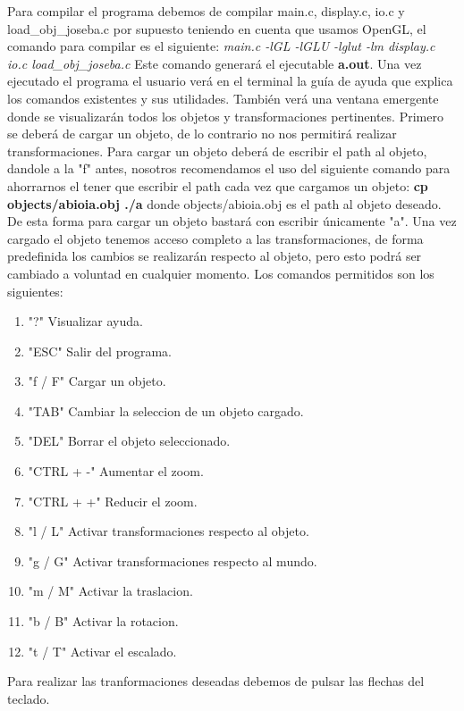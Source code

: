 \documentclass[12pt,a4paper]{article}
\begin{document}
Para compilar el programa debemos de compilar main.c, display.c, io.c y load\_obj\_joseba.c por supuesto teniendo en cuenta que usamos OpenGL, el comando para compilar es el siguiente:\newline
\textit{main.c -lGL -lGLU -lglut -lm display.c io.c load\_obj\_joseba.c}\newline
Este comando generará el ejecutable \textbf{a.out}. \newline
Una vez ejecutado el programa el usuario verá en el terminal la guía de ayuda que explica los comandos existentes y sus utilidades. También verá una ventana emergente donde se visualizarán todos los objetos y transformaciones pertinentes. \newline
Primero se deberá de cargar un objeto, de lo contrario no nos permitirá realizar transformaciones. Para cargar un objeto deberá de escribir el path al objeto, dandole a la "f" antes, nosotros recomendamos el uso del siguiente comando para ahorrarnos el tener que escribir el path cada vez que cargamos un objeto: \textbf{cp objects/abioia.obj ./a} donde objects/abioia.obj es el path al objeto deseado. De esta forma para cargar un objeto bastará con escribir únicamente "a".\newline
Una vez cargado el objeto tenemos acceso completo a las transformaciones, de forma predefinida los cambios se realizarán respecto al objeto, pero esto podrá ser cambiado a voluntad en cualquier momento. Los comandos permitidos son los siguientes:
\begin{enumerate}
\item "?"		 		 Visualizar ayuda.
\item "ESC"		 		 Salir del programa.
\item "f / F"				 Cargar un objeto.
\item "TAB"		 		 Cambiar la seleccion de un objeto cargado.
\item "DEL"				 Borrar el objeto seleccionado.
\item "CTRL + -"		 Aumentar el zoom.
\item "CTRL + +"		 Reducir el zoom.
\item "l / L"		 	 Activar transformaciones respecto al objeto.
\item "g / G"		 	 Activar transformaciones respecto al mundo.
\item "m / M"		 	 Activar la traslacion.
\item "b / B"			 Activar la rotacion.
\item "t / T"		 	 Activar el escalado.
\end{enumerate}
Para realizar las tranformaciones deseadas debemos de pulsar las flechas del teclado.\newline
\end{document}
